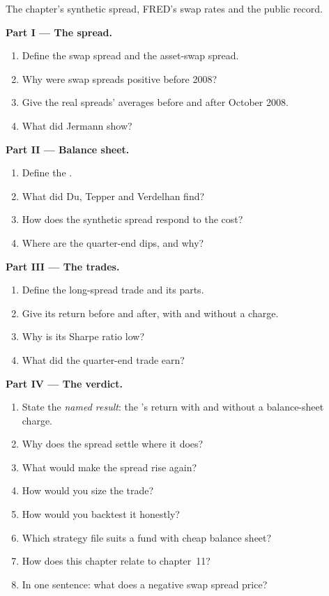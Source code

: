 \begin{problem}\label{pb:s2:swap-spread-and-asset-swap-trades:1}
The chapter's synthetic spread, FRED's swap rates and the public record.

\medskip\noindent\textbf{Part I --- The spread.}
\begin{enumerate}
\item Define the swap spread and the asset-swap spread.
\item Why were swap spreads positive before 2008?
\item Give the real spreads' averages before and after October 2008.
\item What did Jermann show?
\end{enumerate}

\medskip\noindent\textbf{Part II --- Balance sheet.}
\begin{enumerate}[resume]
\item Define the .
\item What did Du, Tepper and Verdelhan find?
\item How does the synthetic spread respond to the cost?
\item Where are the quarter-end dips, and why?
\end{enumerate}

\medskip\noindent\textbf{Part III --- The trades.}
\begin{enumerate}[resume]
\item Define the long-spread trade and its parts.
\item Give its return before and after, with and without a charge.
\item Why is its Sharpe ratio low?
\item What did the quarter-end trade earn?
\end{enumerate}

\medskip\noindent\textbf{Part IV --- The verdict.}
\begin{enumerate}[resume]
\item State the \emph{named result}: the 's return with and without a balance-sheet charge.
\item Why does the spread settle where it does?
\item What would make the spread rise again?
\item How would you size the trade?
\item How would you backtest it honestly?
\item Which strategy file suits a fund with cheap balance sheet?
\item How does this chapter relate to chapter~11?
\item In one sentence: what does a negative swap spread price?
\end{enumerate}
\end{problem}

